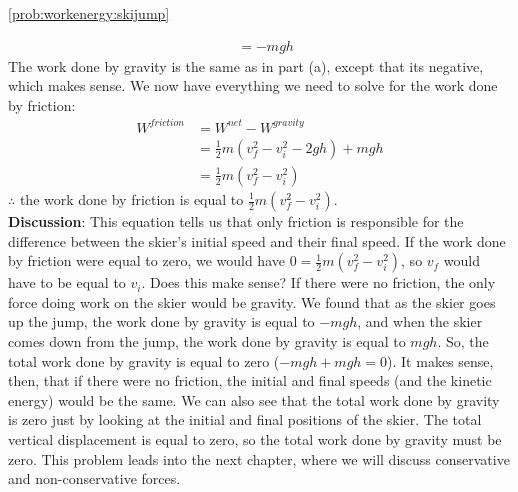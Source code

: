 \begin{solution}{\ref{prob:workenergy:skijump}}
\begin{enumerate}[label=\alph*)]
\begin{align*}
&=-mgh
\end{align*}
The work done by gravity is the same as in part (a), except that its negative, which makes sense. We now have everything we need to solve for the work done by friction:
\begin{align*}
W^{friction}&=W^{net}-W^{gravity}\\
&=\frac{1}{2}m(v_f^2-v_i^2-2gh)+mgh\\
&=\frac{1}{2}m(v_f^2-v_i^2)
\end{align*}
$\therefore$ the work done by friction is equal to $\frac{1}{2}m(v_f^2-v_i^2)$. \\

\textbf{Discussion}: This equation tells us that only friction is responsible for the difference between the skier's initial speed and their final speed. If the work done by friction were equal to zero, we would have $0=\frac{1}{2}m(v_f^2-v_i^2)$, so $v_f$ would have to be equal to $v_i$. Does this make sense? If there were no friction, the only force doing work on the skier would be gravity. We found that as the skier goes up the jump, the work done by gravity is equal to $-mgh$, and when the skier comes down from the jump, the work done by gravity is equal to $mgh$. So, the total work done by gravity is equal to zero ($-mgh+mgh=0$). It makes sense, then, that if there were no friction, the initial and final speeds (and the kinetic energy) would be the same. We can also see that the total work done by gravity is zero just by looking at the initial and final positions of the skier. The total vertical displacement is equal to zero, so the total work done by gravity must be zero. This problem leads into the next chapter, where we will discuss conservative and non-conservative forces. \\
\end{enumerate}
\end{solution}

